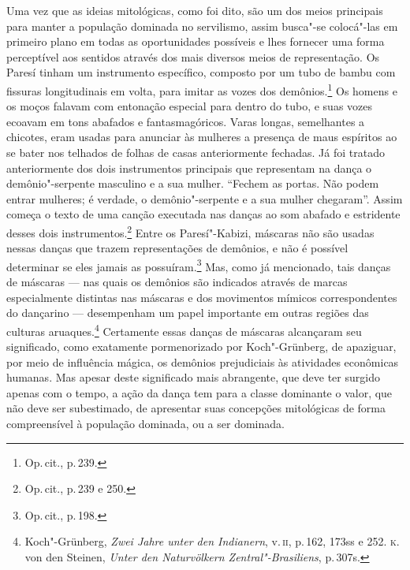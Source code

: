 Uma vez que as ideias mitológicas, como foi dito, são um dos meios
principais para manter a população dominada no servilismo, assim
busca"-se colocá"-las em primeiro plano em todas as oportunidades
possíveis e lhes fornecer uma forma perceptível aos sentidos através dos
mais diversos meios de representação. Os Paresí tinham um instrumento
específico, composto por um tubo de bambu com fissuras longitudinais em
volta, para imitar as vozes dos demônios.\footnote{Op.\,cit., p.\,239.} Os
homens e os moços falavam com entonação especial para dentro do tubo, e
suas vozes ecoavam em tons abafados e fantasmagóricos. Varas longas,
semelhantes a chicotes, eram usadas para anunciar às mulheres a presença
de maus espíritos ao se bater nos telhados de folhas de casas
anteriormente fechadas. Já foi tratado anteriormente dos dois instrumentos
principais que representam na dança o demônio"-serpente masculino e a sua
mulher. ``Fechem as portas. Não podem entrar mulheres; é verdade, o
demônio"-serpente e a sua mulher chegaram''. Assim começa o texto de uma
canção executada nas danças ao som abafado e estridente desses
dois instrumentos.\footnote{Op.\,cit., p.\,239 e 250.} Entre os
Paresí"-Kabizi, máscaras não são usadas nessas danças que trazem
representações de demônios, e não é possível determinar se eles jamais
as possuíram.\footnote{Op.\,cit., p.\,198.} Mas, como já mencionado, tais
danças de máscaras --- nas quais os demônios são indicados através de
marcas especialmente distintas nas máscaras e dos movimentos mímicos
correspondentes do dançarino --- desempenham um papel importante em
outras regiões das culturas aruaques.\footnote{Koch"-Grünberg, \textit{Zwei
  Jahre unter den Indianern}, v.\,\textsc{ii}, p.\,162, 173ss e 252. \textsc{k}.\,von den
  Steinen, \textit{Unter den Naturvölkern Zentral"-Brasiliens}, p.\,307s.}
Certamente essas danças de máscaras alcançaram seu significado, como
exatamente pormenorizado por Koch"-Grünberg, de apaziguar, por meio de
influência mágica, os demônios prejudiciais às atividades econômicas
humanas. Mas apesar deste significado mais abrangente, que deve ter
surgido apenas com o tempo, a ação da dança tem para a classe dominante
o valor, que não deve ser subestimado, de apresentar suas concepções
mitológicas de forma compreensível à população dominada, ou a ser dominada.


